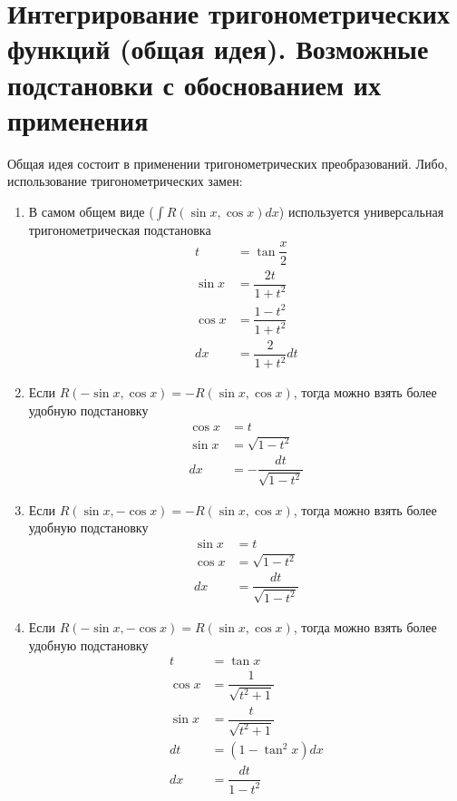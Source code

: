 \documentclass[12pt]{article}
\begin{document}
\section{Интегрирование тригонометрических функций (общая идея). Возможные подстановки с обоснованием их применения}
Общая идея состоит в применении тригонометрических преобразований. Либо, использование тригонометрических замен:
\begin{enumerate}
    \item В самом общем виде ($\int R(\sin x, \cos x)dx$) используется универсальная тригонометрическая подстановка
          \begin{align*}
              t      & = \tan \dfrac{x}{2}        \\
              \sin x & = \dfrac{2t}{1 + t^2}      \\
              \cos x & = \dfrac{1 - t^2}{1 + t^2} \\
              dx     & = \dfrac{2}{1 + t^2}dt
          \end{align*}
    \item Если $R(-\sin x, \cos x) = -R(\sin x, \cos x)$, тогда можно взять более удобную подстановку
          \begin{align*}
              \cos x & = t                           \\
              \sin x & = \sqrt{1 - t^2}              \\
              dx     & = -\dfrac{dt}{\sqrt{1 - t^2}}
          \end{align*}
    \item Если $R(\sin x, -\cos x) = -R(\sin x, \cos x)$, тогда можно взять более удобную подстановку
          \begin{align*}
              \sin x & = t                          \\
              \cos x & = \sqrt{1 - t^2}             \\
              dx     & = \dfrac{dt}{\sqrt{1 - t^2}}
          \end{align*}
    \item Если $R(-\sin x, -\cos x) = R(\sin x, \cos x)$, тогда можно взять более удобную подстановку
          \begin{align*}
              t      & = \tan x                    \\
              \cos x & = \dfrac{1}{\sqrt{t^2 + 1}} \\
              \sin x & = \dfrac{t}{\sqrt{t^2 + 1}} \\
              dt     & =  (1 - \tan^2 x)dx         \\
              dx     & = \dfrac{dt}{1 - t^2}
          \end{align*}
\end{enumerate}
\end{document}
